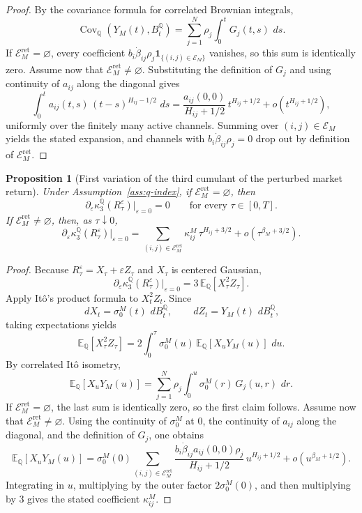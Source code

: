 \documentclass[11pt,a4paper]{amsart}
\theoremstyle{plain}
\newtheorem{proposition}[theorem]{Proposition}
\theoremstyle{definition}
\theoremstyle{remark}
\DeclareMathOperator{\Cov}{Cov}
\newcommand{\QQ}{\mathbb{Q}}
\newcommand{\EE}{\mathbb{E}}
\newcommand{\cE}{\mathcal{E}}
\newcommand{\one}{\mathbf{1}}
\newcommand{\dd}{\,d}
\begin{document}
\begin{proof}
By the covariance formula for correlated Brownian integrals,
\[
        \Cov_\QQ(Y_M(t),B_t^\QQ)
        =
        \sum_{j=1}^N \rho_j \int_0^t G_j(t,s)\,\dd s.
\]
If \(\cE_M^{\mathrm{ret}}=\varnothing\), every coefficient
\(b_i\dot\beta_{ij}\rho_j\one_{\{(i,j)\in\cE_M\}}\) vanishes, so this sum is identically zero.
Assume now that \(\cE_M^{\mathrm{ret}}\neq\varnothing\).
Substituting the definition of \(G_j\) and using continuity of \(a_{ij}\) along the diagonal gives
\[
        \int_0^t a_{ij}(t,s)\,(t-s)^{H_{ij}-1/2}\,\dd s
        =
        \frac{a_{ij}(0,0)}{H_{ij}+1/2}\,t^{H_{ij}+1/2}
        +
        o\!\left(t^{H_{ij}+1/2}\right),
\]
uniformly over the finitely many active channels.  Summing over \((i,j)\in\cE_M\) yields the
stated expansion, and channels with \(b_i\dot\beta_{ij}\rho_j=0\) drop out by definition of
\(\cE_M^{\mathrm{ret}}\).
\end{proof}

\begin{proposition}[First variation of the third cumulant of the perturbed market return]\label{prop:market-kappa3}
Under Assumption~\ref{ass:q-index}, if \(\cE_M^{\mathrm{ret}}=\varnothing\), then
\[
        \partial_\varepsilon
        \kappa_3^\QQ(R_\tau^\varepsilon)\big|_{\varepsilon=0}
        =
        0
        \qquad
        \text{for every }\tau\in[0,T].
\]
If \(\cE_M^{\mathrm{ret}}\neq\varnothing\), then, as \(\tau\downarrow0\),
\[
        \partial_\varepsilon
        \kappa_3^\QQ(R_\tau^\varepsilon)\big|_{\varepsilon=0}
        =
        \sum_{(i,j)\in\cE_M^{\mathrm{ret}}}
        \kappa_{ij}^M\,\tau^{H_{ij}+3/2}
        +
        o\!\left(\tau^{\beta_M+3/2}\right).
\]
\end{proposition}

\begin{proof}
Because \(R_\tau^\varepsilon=X_\tau+\varepsilon Z_\tau\) and \(X_\tau\) is centered Gaussian,
\[
        \partial_\varepsilon
        \kappa_3^\QQ(R_\tau^\varepsilon)\big|_{\varepsilon=0}
        =
        3\,\EE_\QQ[X_\tau^2 Z_\tau].
\]
Apply It\^o's product formula to \(X_t^2 Z_t\).  Since
\[
        \dd X_t=\sigma_0^M(t)\,\dd B_t^\QQ,
        \qquad
        \dd Z_t=Y_M(t)\,\dd B_t^\QQ,
\]
taking expectations yields
\[
        \EE_\QQ[X_\tau^2 Z_\tau]
        =
        2\int_0^\tau \sigma_0^M(u)\,\EE_\QQ[X_uY_M(u)]\,\dd u.
\]
By correlated It\^o isometry,
\[
        \EE_\QQ[X_uY_M(u)]
        =
        \sum_{j=1}^N \rho_j\int_0^u \sigma_0^M(r)\,G_j(u,r)\,\dd r.
\]
If \(\cE_M^{\mathrm{ret}}=\varnothing\), the last sum is identically zero, so the first claim
follows.  Assume now that \(\cE_M^{\mathrm{ret}}\neq\varnothing\).
Using the continuity of \(\sigma_0^M\) at \(0\), the continuity of \(a_{ij}\) along the diagonal,
and the definition of \(G_j\), one obtains
\[
        \EE_\QQ[X_uY_M(u)]
        =
        \sigma_0^M(0)
        \sum_{(i,j)\in\cE_M^{\mathrm{ret}}}
        \frac{b_i\dot\beta_{ij}a_{ij}(0,0)\rho_j}{H_{ij}+1/2}\,
        u^{H_{ij}+1/2}
        +
        o\!\left(u^{\beta_M+1/2}\right).
\]
Integrating in \(u\), multiplying by the outer factor \(2\sigma_0^M(0)\), and then multiplying by
\(3\) gives the stated coefficient \(\kappa_{ij}^M\).
\end{proof}
\end{document}
